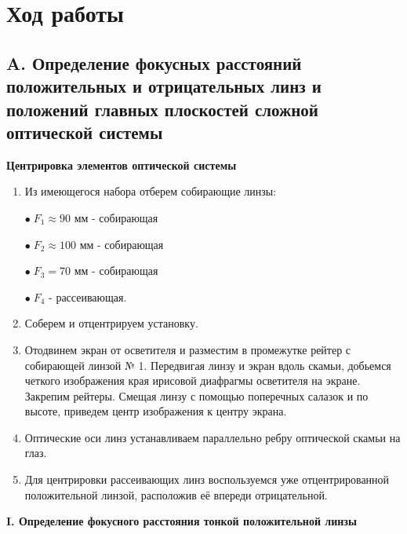 \documentclass[a4paper,12pt]{article} %
\begin{document}
	\newpage
	\section*{Ход работы}
	\subsection*{A. Определение фокусных расстояний положительных и отрицательных линз и положений главных плоскостей сложной оптической системы}
	
	\begin{center}
		\textbf{Центрировка элементов оптической системы}
	\end{center}

	\begin{enumerate}
		\item Из имеющегося набора отберем собирающие линзы: 
		
		$\bullet \; F_1 \approx 90$ мм - собирающая
		 
		$\bullet \; F_2 \approx 100$ мм - собирающая	

		$\bullet \; F_3 = 70$ мм - собирающая
		
		$\bullet \; F_4$ - рассеивающая.
		
		
		\item Соберем и отцентрируем установку.
		
		\item Отодвинем экран от осветителя и разместим в промежутке рейтер с собирающей линзой № 1. Передвигая линзу и экран вдоль скамьи, добьемся четкого изображения края ирисовой диафрагмы осветителя на экране. Закрепим рейтеры. Смещая линзу с помощью поперечных салазок и по высоте, приведем центр изображения к центру экрана.
		
		\item Оптические оси линз устанавливаем параллельно ребру оптической скамьи на глаз.
		
		\item Для центрировки рассеивающих линз воспользуемся уже отцентрированной положительной линзой, расположив её впереди отрицательной.
		
	\end{enumerate}


	\begin{center}
	\textbf{I. Определение фокусного расстояния тонкой положительной линзы}
	\end{center}
	
\end{document}

